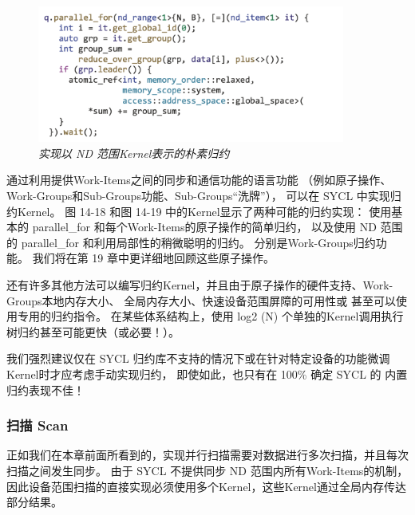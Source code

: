 \begin{figure}[H]
	\centering
	\includegraphics[width=0.9\textwidth]{figs/F14.19.png}
	\caption{\textit{实现以 ND 范围Kernel表示的朴素归约 }}
\end{figure}

通过利用提供Work-Items之间的同步和通信功能的语言功能
（例如原子操作、Work-Groups和Sub-Groups功能、Sub-Groups“洗牌”），
可以在 SYCL 中实现归约Kernel。 
图 14-18 和图 14-19 中的Kernel显示了两种可能的归约实现：
使用基本的 parallel\_for 和每个Work-Items的原子操作的简单归约，
以及使用 ND 范围的 parallel\_for 和利用局部性的稍微聪明的归约。 
分别是Work-Groups归约功能。 我们将在第 19 章中更详细地回顾这些原子操作。

还有许多其他方法可以编写归约Kernel，并且由于原子操作的硬件支持、Work-Groups本地内存大小、
全局内存大小、快速设备范围屏障的可用性或 甚至可以使用专用的归约指令。 
在某些体系结构上，使用 log2 (N) 个单独的Kernel调用执行树归约甚至可能更快（或必要！）。

我们强烈建议仅在 SYCL 归约库不支持的情况下或在针对特定设备的功能微调Kernel时才应考虑手动实现归约，
即使如此，也只有在 100\% 确定 SYCL 的 内置归约表现不佳！

\subsubsection{扫描 Scan}
正如我们在本章前面所看到的，实现并行扫描需要对数据进行多次扫描，并且每次扫描之间发生同步。 
由于 SYCL 不提供同步 ND 范围内所有Work-Items的机制，
因此设备范围扫描的直接实现必须使用多个Kernel，这些Kernel通过全局内存传达部分结果。

